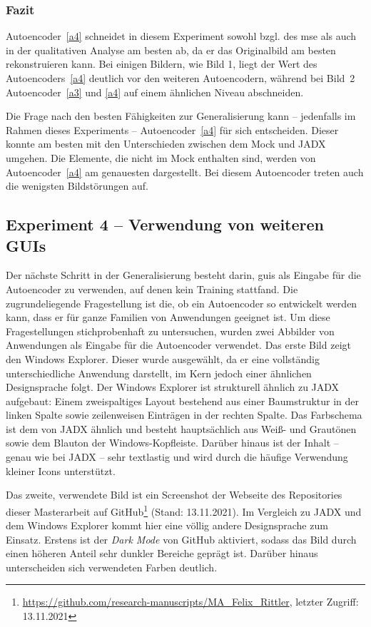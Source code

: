 \subsubsection*{Fazit}
Autoencoder~\ref{a4} schneidet in diesem Experiment sowohl bzgl. des \gls{mse} als auch in der qualitativen Analyse am besten ab, da er das Originalbild am besten rekonstruieren kann. Bei einigen Bildern, wie Bild 1, liegt der Wert des Autoencoders~\ref{a4} deutlich vor den weiteren Autoencodern, während bei Bild~2 Autoencoder~\ref{a3} und \ref{a4} auf einem ähnlichen Niveau abschneiden.

Die Frage nach den besten Fähigkeiten zur Generalisierung kann -- jedenfalls im Rahmen dieses Experiments -- Autoencoder~\ref{a4} für sich entscheiden. Dieser konnte am besten mit den Unterschieden zwischen dem Mock und JADX umgehen. Die Elemente, die nicht im Mock enthalten sind, werden von Autoencoder~\ref{a4} am genauesten dargestellt. Bei diesem Autoencoder treten auch die wenigsten Bildstörungen auf.

\subsection{Experiment 4 -- Verwendung von weiteren GUIs}
\label{subsec:exp4}

Der nächste Schritt in der Generalisierung besteht darin, \glspl{gui} als Eingabe für die Autoencoder zu verwenden, auf denen kein Training stattfand. Die zugrundeliegende Fragestellung ist die, ob ein Autoencoder so entwickelt werden kann, dass er für ganze Familien von Anwendungen geeignet ist. Um diese Fragestellungen stichprobenhaft zu untersuchen, wurden zwei Abbilder von Anwendungen als Eingabe für die Autoencoder verwendet. Das erste Bild zeigt den Windows Explorer. Dieser wurde ausgewählt, da er eine vollständig unterschiedliche Anwendung darstellt, im Kern jedoch einer ähnlichen Designsprache folgt. Der Windows Explorer ist strukturell ähnlich zu JADX aufgebaut: Einem zweispaltiges Layout bestehend aus einer Baumstruktur in der linken Spalte sowie zeilenweisen Einträgen in der rechten Spalte. Das Farbschema ist dem von JADX ähnlich und besteht hauptsächlich aus Weiß- und Grautönen sowie dem Blauton der Windows-Kopfleiste. Darüber hinaus ist der Inhalt -- genau wie bei JADX -- sehr textlastig und wird durch die häufige Verwendung kleiner Icons unterstützt.

Das zweite, verwendete Bild ist ein Screenshot der Webseite des Repositories dieser Masterarbeit auf GitHub\footnote{\url{https://github.com/research-manuscripts/MA_Felix_Rittler}, letzter Zugriff: 13.11.2021} (Stand: 13.11.2021). Im Vergleich zu JADX und dem Windows Explorer kommt hier eine völlig andere Designsprache zum Einsatz. Erstens ist der \emph{Dark Mode} von GitHub aktiviert, sodass das Bild durch einen höheren Anteil sehr dunkler Bereiche geprägt ist. Darüber hinaus unterscheiden sich verwendeten Farben deutlich.

